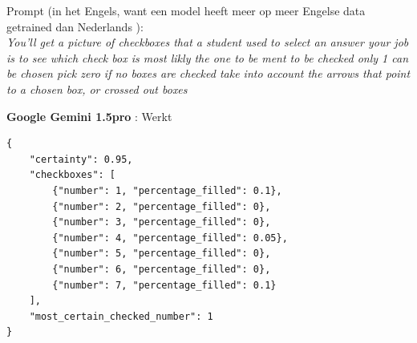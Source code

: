 \documentclass[12pt]{article}
\begin{document}
\begin{multicols}{2}
\noindent Prompt (in het Engels, want een model heeft meer op meer Engelse data getrained dan Nederlands ):\\
\textit{You'll get a picture of checkboxes that a student used to select an answer
    your job is to see which check box is most likly the one to be ment to be checked
    only 1 can be chosen
    pick zero if no boxes are checked 
    take into account the arrows that point to a chosen box, or crossed out boxes}


\end{multicols}
\pagebreak

\textbf{Google Gemini 1.5pro} : Werkt
\begin{listing}[H]
    
    \begin{verbatim}
{
    "certainty": 0.95, 
    "checkboxes": [
        {"number": 1, "percentage_filled": 0.1}, 
        {"number": 2, "percentage_filled": 0}, 
        {"number": 3, "percentage_filled": 0}, 
        {"number": 4, "percentage_filled": 0.05}, 
        {"number": 5, "percentage_filled": 0}, 
        {"number": 6, "percentage_filled": 0}, 
        {"number": 7, "percentage_filled": 0.1}
    ], 
    "most_certain_checked_number": 1
}
        \end{verbatim}
\end{listing}
\pagebreak
\end{document}
